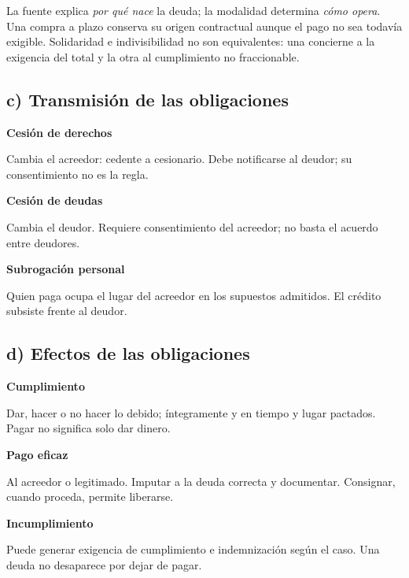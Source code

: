 {La fuente explica \emph{por qué nace} la deuda; la modalidad determina \emph{cómo opera}. Una compra a plazo conserva su origen contractual aunque el pago no sea todavía exigible. Solidaridad e indivisibilidad no son equivalentes: una concierne a la exigencia del total y la otra al cumplimiento no fraccionable.

\clearpage
\setlength{\parskip}{1pt}
\titlespacing*{\subsection}{0pt}{3pt}{1pt}
\subsection*{c) Transmisión de las obligaciones}
{\textbf{Cesión de derechos}\par Cambia el acreedor: cedente a cesionario. Debe notificarse al deudor; su consentimiento no es la regla.}
{\textbf{Cesión de deudas}\par Cambia el deudor. Requiere consentimiento del acreedor; no basta el acuerdo entre deudores.}
{\textbf{Subrogación personal}\par Quien paga ocupa el lugar del acreedor en los supuestos admitidos. El crédito subsiste frente al deudor.}

\subsection*{d) Efectos de las obligaciones}
{\textbf{Cumplimiento}\par Dar, hacer o no hacer lo debido; íntegramente y en tiempo y lugar pactados. Pagar no significa solo dar dinero.}
{\textbf{Pago eficaz}\par Al acreedor o legitimado. Imputar a la deuda correcta y documentar. Consignar, cuando proceda, permite liberarse.}
{\textbf{Incumplimiento}\par Puede generar exigencia de cumplimiento e indemnización según el caso. Una deuda no desaparece por dejar de pagar.}

}
